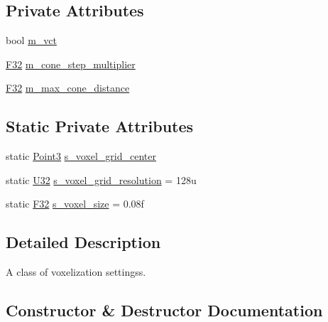 \subsection*{Private Attributes}
\begin{DoxyCompactItemize}
\item 
bool \mbox{\hyperlink{classmage_1_1rendering_1_1_voxelization_settings_ac2edf702f2441db192bef28ec616b873}{m\+\_\+vct}}
\item 
\mbox{\hyperlink{namespacemage_aa97e833b45f06d60a0a9c4fc22ae02c0}{F32}} \mbox{\hyperlink{classmage_1_1rendering_1_1_voxelization_settings_a4d58d4ab9b43d2631415da65321a8c83}{m\+\_\+cone\+\_\+step\+\_\+multiplier}}
\item 
\mbox{\hyperlink{namespacemage_aa97e833b45f06d60a0a9c4fc22ae02c0}{F32}} \mbox{\hyperlink{classmage_1_1rendering_1_1_voxelization_settings_adb6172810eba8f59553bcbb9e2a7cbe3}{m\+\_\+max\+\_\+cone\+\_\+distance}}
\end{DoxyCompactItemize}
\subsection*{Static Private Attributes}
\begin{DoxyCompactItemize}
\item 
static \mbox{\hyperlink{structmage_1_1_point3}{Point3}} \mbox{\hyperlink{classmage_1_1rendering_1_1_voxelization_settings_a37151063ebbf6ae6ea193fb0ce05d270}{s\+\_\+voxel\+\_\+grid\+\_\+center}}
\item 
static \mbox{\hyperlink{namespacemage_a41c104c036fba3756a74e19f793eeaa1}{U32}} \mbox{\hyperlink{classmage_1_1rendering_1_1_voxelization_settings_aa709675f6700320077718e1954854ca6}{s\+\_\+voxel\+\_\+grid\+\_\+resolution}} = 128u
\item 
static \mbox{\hyperlink{namespacemage_aa97e833b45f06d60a0a9c4fc22ae02c0}{F32}} \mbox{\hyperlink{classmage_1_1rendering_1_1_voxelization_settings_a647150f56ef8546b6e18f5ad8dd2e661}{s\+\_\+voxel\+\_\+size}} = 0.\+08f
\end{DoxyCompactItemize}


\subsection{Detailed Description}
A class of voxelization settingss. 

\subsection{Constructor \& Destructor Documentation}
\mbox{\label{classmage_1_1rendering_1_1_voxelization_settings_a5c866be104571097091b07f113b2f680}} 
